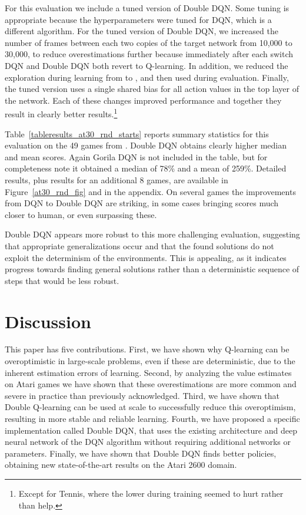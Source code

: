 \documentclass[letterpaper]{article}
\begin{document}
For this evaluation we include a tuned version of Double DQN.  Some tuning is appropriate because the hyperparameters were tuned for DQN, which is a different algorithm.  For the tuned version of Double DQN, we increased the number of frames between each two copies of the target network from 10,000 to 30,000, to reduce overestimations further because immediately after each switch DQN and Double DQN both revert to Q-learning.  In addition, we reduced the exploration during learning from  to , and then used  during evaluation.  Finally, the tuned version uses a single shared bias for all action values in the top layer of the network.  Each of these changes improved performance and together they result in clearly better results.\footnote{Except for Tennis, where the lower  during training seemed to hurt rather than help.}

Table~\ref{tableresults_at30_rnd_starts} reports summary statistics for this evaluation on the 49 games from \citet{Mnih:2015}.  Double DQN obtains clearly higher median and mean scores.  Again Gorila DQN \citep{Nair:2015} is not included in the table, but for completeness note it obtained a median of 78\% and a mean of 259\%. 
Detailed results, plus results for an additional 8 games, are available in Figure~\ref{at30_rnd_fig} and in the appendix. On several games the improvements from DQN to Double DQN are striking, in some cases bringing scores much closer to human, or even surpassing these.


Double DQN appears more robust to this more challenging evaluation,
suggesting that appropriate generalizations occur and that the found solutions do not exploit the determinism of the environments.
This is appealing, as it indicates progress towards finding general solutions rather than a deterministic sequence of steps that would be less robust.

\section{Discussion}

This paper has five contributions.  First, we have shown why Q-learning can be overoptimistic in large-scale problems, even if these are deterministic, due to the inherent estimation errors of learning.  Second, by analyzing the value estimates on Atari games we have shown that these overestimations are more common and severe in practice than previously acknowledged.
Third, we have shown that Double Q-learning can be used at scale to successfully reduce this overoptimism, resulting in more stable and reliable learning.  Fourth, we have proposed a specific implementation called Double DQN, that uses the existing architecture and deep neural network of the DQN algorithm without requiring additional networks or parameters.  Finally, we have shown that Double DQN finds better policies, obtaining new state-of-the-art results on the Atari 2600 domain.
\end{document}
